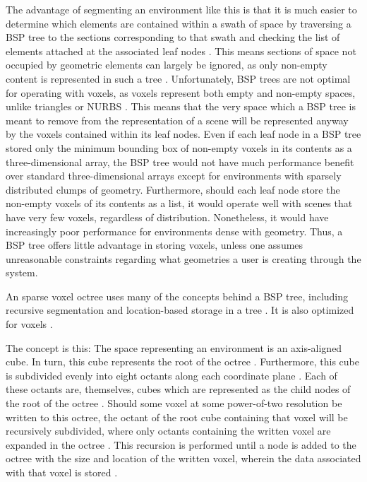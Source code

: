 \documentclass[onecolumn, draftclsnofoot,10pt, compsoc]{IEEEtran}
\newcounter{threesection}[subsubsection]
\begin{document}
The advantage of segmenting an environment like this is that it is much easier to determine which elements are contained within a swath of space by traversing a BSP tree to the sections corresponding to that swath and checking the list of elements attached at the associated leaf nodes \cite{braxTech5}.
This means sections of space not occupied by geometric elements can largely be ignored, as only non-empty content is represented in such a tree \cite{braxTech5}.
Unfortunately, BSP trees are not optimal for operating with voxels, as voxels represent both empty and non-empty spaces, unlike triangles or NURBS \cite{braxTech1}.
This means that the very space which a BSP tree is meant to remove from the representation of a scene will be represented anyway by the voxels contained within its leaf nodes.
Even if each leaf node in a BSP tree stored only the minimum bounding box of non-empty voxels in its contents as a three-dimensional array, the BSP tree would not have much performance benefit over standard three-dimensional arrays except for environments with sparsely distributed clumps of geometry.
Furthermore, should each leaf node store the non-empty voxels of its contents as a list, it would operate well with scenes that have very few voxels, regardless of distribution. Nonetheless, it would have increasingly poor performance for environments dense with geometry. 
Thus, a BSP tree offers little advantage in storing voxels, unless one assumes unreasonable constraints regarding what geometries a user is creating through the system.



An sparse voxel octree uses many of the concepts behind a BSP tree, including recursive segmentation and location-based storage in a tree \cite{braxTech3}.
It is also optimized for voxels \cite{braxTech3}.

The concept is this: The space representing an environment is an axis-aligned cube. In turn, this cube represents the root of the octree \cite{braxTech3}.
Furthermore, this cube is subdivided evenly into eight octants along each coordinate plane \cite{braxTech3}.
Each of these octants are, themselves, cubes which are represented as the child nodes of the root of the octree \cite{braxTech3}.
Should some voxel at some power-of-two resolution be written to this octree, the octant of the root cube containing that voxel will be recursively subdivided, where only octants containing the written voxel are expanded in the octree \cite{braxTech3}. 
This recursion is performed until a node is added to the octree with the size and location of the written voxel, wherein the data associated with that voxel is stored \cite{braxTech3}.
\end{document}
